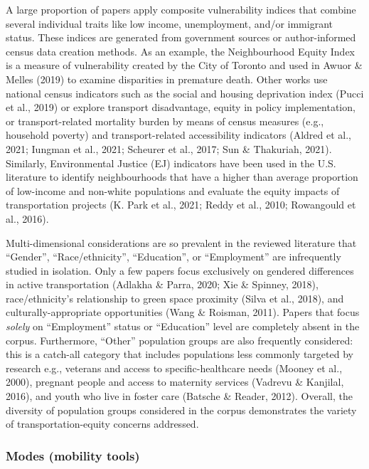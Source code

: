 \documentclass[
  letterpaper,
  DIV=11,
  numbers=noendperiod]{scrartcl}
\begin{document}
A large proportion of papers apply composite vulnerability indices that
combine several individual traits like low income, unemployment, and/or
immigrant status. These indices are generated from government sources or
author-informed census data creation methods. As an example, the
Neighbourhood Equity Index is a measure of vulnerability created by the
City of Toronto and used in Awuor \& Melles (2019) to examine
disparities in premature death. Other works use national census
indicators such as the social and housing deprivation index (Pucci et
al., 2019) or explore transport disadvantage, equity in policy
implementation, or transport-related mortality burden by means of census
measures (e.g., household poverty) and transport-related accessibility
indicators (Aldred et al., 2021; Iungman et al., 2021; Scheurer et al.,
2017; Sun \& Thakuriah, 2021). Similarly, Environmental Justice (EJ)
indicators have been used in the U.S. literature to identify
neighbourhoods that have a higher than average proportion of low-income
and non-white populations and evaluate the equity impacts of
transportation projects (K. Park et al., 2021; Reddy et al., 2010;
Rowangould et al., 2016).

Multi-dimensional considerations are so prevalent in the reviewed
literature that ``Gender'', ``Race/ethnicity'', ``Education'', or
``Employment'' are infrequently studied in isolation. Only a few papers
focus exclusively on gendered differences in active transportation
(Adlakha \& Parra, 2020; Xie \& Spinney, 2018), race/ethnicity's
relationship to green space proximity (Silva et al., 2018), and
culturally-appropriate opportunities (Wang \& Roisman, 2011). Papers
that focus \emph{solely} on ``Employment'' status or ``Education'' level
are completely absent in the corpus. Furthermore, ``Other'' population
groups are also frequently considered: this is a catch-all category that
includes populations less commonly targeted by research e.g., veterans
and access to specific-healthcare needs (Mooney et al., 2000), pregnant
people and access to maternity services (Vadrevu \& Kanjilal, 2016), and
youth who live in foster care (Batsche \& Reader, 2012). Overall, the
diversity of population groups considered in the corpus demonstrates the
variety of transportation-equity concerns addressed.

\subsubsection{Modes (mobility tools)}\label{modes-mobility-tools}
\end{document}
